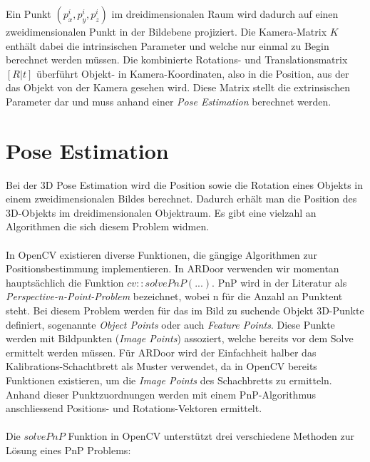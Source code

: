 Ein Punkt $(p^i_x, p^i_y, p^i_z)$ im dreidimensionalen Raum wird dadurch auf einen zweidimensionalen Punkt in der Bildebene projiziert. Die Kamera-Matrix $K$ enthält dabei die intrinsischen Parameter und welche nur einmal zu Begin berechnet werden müssen. Die kombinierte Rotations- und Translationsmatrix $[R|t]$ überführt Objekt- in Kamera-Koordinaten, also in die Position, aus der das Objekt von der Kamera gesehen wird. Diese Matrix stellt die extrinsischen Parameter dar und muss anhand einer \textit{Pose Estimation} berechnet werden.

\section{Pose Estimation}
Bei der 3D Pose Estimation wird die Position sowie die Rotation eines Objekts in einem zweidimensionalen Bildes berechnet. Dadurch erhält man die Position des 3D-Objekts im dreidimensionalen Objektraum. Es gibt eine vielzahl an Algorithmen die sich diesem Problem widmen.

\paragraph{}
In OpenCV existieren diverse Funktionen, die gängige Algorithmen zur Positionsbestimmung implementieren. In ARDoor verwenden wir momentan hauptsächlich die Funktion $cv::solvePnP(...)$. PnP wird in der Literatur als \textit{Perspective-n-Point-Problem} bezeichnet, wobei n für die Anzahl an Punktent steht. Bei diesem Problem werden für das im Bild zu suchende Objekt 3D-Punkte definiert, sogenannte \textit{Object Points} oder auch \textit{Feature Points}. Diese Punkte werden mit Bildpunkten (\textit{Image Points}) assoziert, welche bereits vor dem Solve ermittelt werden müssen. Für ARDoor wird der Einfachheit halber das Kalibrations-Schachtbrett als Muster verwendet, da in OpenCV bereits Funktionen existieren, um die \textit{Image Points} des Schachbretts zu ermitteln. Anhand dieser Punktzuordnungen werden mit einem PnP-Algorithmus anschliessend Positions- und Rotations-Vektoren ermittelt.

\paragraph{}
Die $solvePnP$ Funktion in OpenCV unterstützt drei verschiedene Methoden zur Lösung eines PnP Problems:

